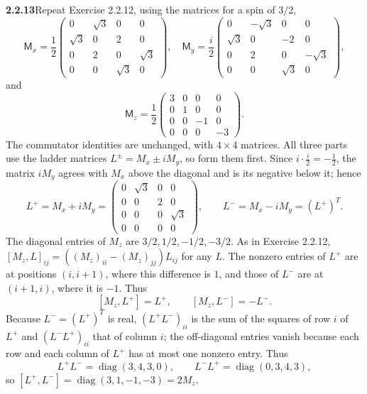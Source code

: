 \par\bigskip
\noindent\textbf{2.2.13}\quad Repeat Exercise 2.2.12, using the matrices for a
spin of $3/2$,
\[
\mathsf{M}_{x}=\frac{1}{2}\begin{pmatrix}
0&\sqrt{3}&0&0\\ \sqrt{3}&0&2&0\\ 0&2&0&\sqrt{3}\\ 0&0&\sqrt{3}&0
\end{pmatrix},\quad
\mathsf{M}_{y}=\frac{i}{2}\begin{pmatrix}
0&-\sqrt{3}&0&0\\ \sqrt{3}&0&-2&0\\ 0&2&0&-\sqrt{3}\\ 0&0&\sqrt{3}&0
\end{pmatrix},
\]
and
\[
\mathsf{M}_{z}=\frac{1}{2}\begin{pmatrix}
3&0&0&0\\ 0&1&0&0\\ 0&0&-1&0\\ 0&0&0&-3\end{pmatrix}.
\]
\solution
The commutator identities are unchanged, with $4\times4$ matrices.
All three parts use the ladder matrices $L^\pm=M_x\pm iM_y$, so form
them first. Since $i\cdot\frac i2=-\frac12$, the matrix $iM_y$ agrees
with $M_x$ above the diagonal and is its negative below it; hence
\[
L^+=M_x+iM_y=
\begin{pmatrix}0&\sqrt3&0&0\\0&0&2&0\\0&0&0&\sqrt3\\0&0&0&0\end{pmatrix},
\qquad L^-=M_x-iM_y=(L^+)^T.
\]
The diagonal entries of $M_z$ are $3/2,1/2,-1/2,-3/2$.
As in Exercise 2.2.12, $[M_z,L]_{ij}=((M_z)_{ii}-(M_z)_{jj})L_{ij}$
for any $L$. The nonzero entries of $L^+$ are at positions $(i,i+1)$,
where this difference is $1$, and those of $L^-$ are at $(i+1,i)$,
where it is $-1$. Thus
\[
[M_z,L^+]=L^+,\qquad [M_z,L^-]=-L^-.
\]
Because $L^-=(L^+)^T$ is real, $(L^+L^-)_{ii}$ is the sum of the
squares of row $i$ of $L^+$ and $(L^-L^+)_{ii}$ that of column $i$;
the off-diagonal entries vanish because each row and each column of
$L^+$ has at most one nonzero entry. Thus
\[
L^+L^-=\operatorname{diag}(3,4,3,0),\qquad
L^-L^+=\operatorname{diag}(0,3,4,3),
\]
so $[L^+,L^-]=\operatorname{diag}(3,1,-1,-3)=2M_z$.

